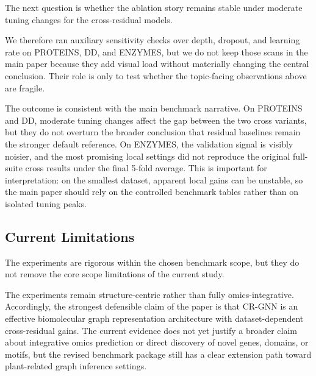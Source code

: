 The next question is whether the ablation story remains stable under moderate tuning changes for the cross-residual models.

We therefore ran auxiliary sensitivity checks over depth, dropout, and learning rate on PROTEINS, DD, and ENZYMES, but we do not keep those scans in the main paper because they add visual load without materially changing the central conclusion. Their role is only to test whether the topic-facing observations above are fragile.

The outcome is consistent with the main benchmark narrative. On PROTEINS and DD, moderate tuning changes affect the gap between the two cross variants, but they do not overturn the broader conclusion that residual baselines remain the stronger default reference. On ENZYMES, the validation signal is visibly noisier, and the most promising local settings did not reproduce the original full-suite cross results under the final 5-fold average. This is important for interpretation: on the smallest dataset, apparent local gains can be unstable, so the main paper should rely on the controlled benchmark tables rather than on isolated tuning peaks.
\FloatBarrier

\subsection{Current Limitations}

The experiments are rigorous within the chosen benchmark scope, but they do not remove the core scope limitations of the current study.

The experiments remain structure-centric rather than fully omics-integrative. Accordingly, the strongest defensible claim of the paper is that CR-GNN is an effective biomolecular graph representation architecture with dataset-dependent cross-residual gains. The current evidence does not yet justify a broader claim about integrative omics prediction or direct discovery of novel genes, domains, or motifs, but the revised benchmark package still has a clear extension path toward plant-related graph inference settings.
